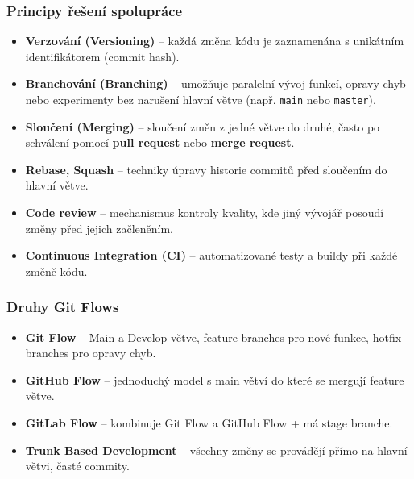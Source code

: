 \subsubsection*{Principy řešení spolupráce}
\begin{itemize}
  \item \textbf{Verzování (Versioning)} – každá změna kódu je zaznamenána s unikátním identifikátorem (commit hash).
  \item \textbf{Branchování (Branching)} – umožňuje paralelní vývoj funkcí, opravy chyb nebo experimenty bez narušení hlavní větve (např. \texttt{main} nebo \texttt{master}).
  \item \textbf{Sloučení (Merging)} – sloučení změn z jedné větve do druhé, často po schválení pomocí \textbf{pull request} nebo \textbf{merge request}.
  \item \textbf{Rebase, Squash} – techniky úpravy historie commitů před sloučením do hlavní větve.
  \item \textbf{Code review} – mechanismus kontroly kvality, kde jiný vývojář posoudí změny před jejich začleněním.
  \item \textbf{Continuous Integration (CI)} – automatizované testy a buildy při každé změně kódu.
\end{itemize}

\subsubsection*{Druhy Git Flows}
\begin{itemize}
  \item \textbf{Git Flow} – Main a Develop větve, feature branches pro nové funkce, hotfix branches pro opravy chyb.
  \item \textbf{GitHub Flow} – jednoduchý model s main větví do které se mergují feature větve.
  \item \textbf{GitLab Flow} – kombinuje Git Flow a GitHub Flow + má stage branche.
  \item \textbf{Trunk Based Development} – všechny změny se provádějí přímo na hlavní větvi, časté commity.
\end{itemize}

